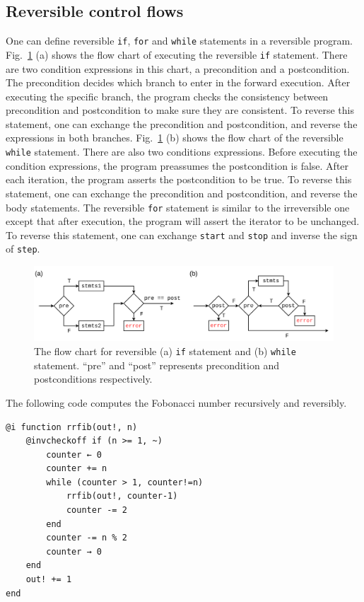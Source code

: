 \documentclass{article}
\newcommand{\<}{\langle}
\renewcommand{\>}{\rangle}
\newcommand{\Fig}[1]{Fig.~\ref{#1}}
\theoremstyle{definition}\newtheorem{definition}{\textit{Definition}}
\begin{document}
\subsection{Reversible control flows}
One can define reversible \texttt{if}, \texttt{for} and \texttt{while} statements in a reversible program.
\Fig{fig:controlflow} (a) shows the flow chart of executing the reversible \texttt{if} statement. There are two condition expressions in this chart, a precondition and a postcondition. The precondition decides which branch to enter in the forward execution. After executing the specific branch, the program checks the consistency between precondition and postcondition to make sure they are consistent. To reverse this statement, one can exchange the precondition and postcondition, and reverse the expressions in both branches.
\Fig{fig:controlflow} (b) shows the flow chart of the reversible \texttt{while} statement. There are also two conditions expressions. Before executing the condition expressions, the program preassumes the postcondition is false.
After each iteration, the program asserts the postcondition to be true. To reverse this statement, one can exchange the precondition and postcondition, and reverse the body statements.
The reversible \texttt{for} statement is similar to the irreversible one except that after execution, the program will assert the iterator to be unchanged. To reverse this statement, one can exchange \texttt{start} and \texttt{stop} and inverse the sign of \texttt{step}.
\begin{figure}
    \centerline{\includegraphics[width=0.9\columnwidth,trim={0 0cm 0 0cm},clip]{controlflow_v2.pdf}}
    \caption{The flow chart for reversible (a) \texttt{if} statement and (b) \texttt{while} statement. ``pre'' and ``post'' represents precondition and postconditions respectively.}\label{fig:controlflow}
\end{figure}

The following code computes the Fobonacci number recursively and reversibly.

\begin{minipage}{.88\columnwidth}
\begin{lstlisting}[mathescape=true,caption={Computing Fibonacci number recursibly and reversibly.},label={lst:fib}]
@i function rrfib(out!, n)
    @invcheckoff if (n >= 1, ~)
        counter ← 0
        counter += n
        while (counter > 1, counter!=n)
            rrfib(out!, counter-1)
            counter -= 2
        end
        counter -= n % 2
        counter → 0
    end
    out! += 1
end
\end{lstlisting}
\end{minipage}
\end{document}
